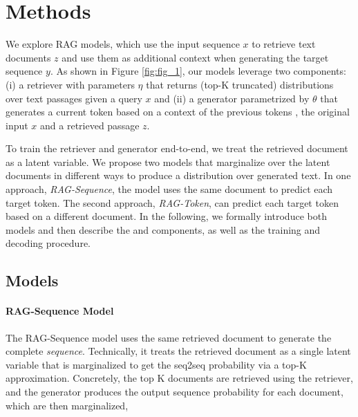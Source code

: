 \documentclass{article}
\begin{document}
\section{Methods}
\newcommand{\doc}{\ensuremath{z}}
\newcommand{\docs}{\ensuremath{\mathbf{z}}}
\newcommand{\answer}{\ensuremath{y}}
\newcommand{\genparam}{\ensuremath{\theta}}
\newcommand{\retparam}{\ensuremath{\eta}}
\newcommand{\query}{\ensuremath{x}}
\newcommand{\peranswer}{p_{\text{\tiny{RAG-Sequence}}}}
\newcommand{\pertoken}{p_{\text{\tiny{RAG-Token}}}}
\newcommand{\denc}{\mathbf{d}}
\newcommand{\qenc}{\mathbf{q}}
\newcommand{\topk}{\ensuremath{\text{top-k}(p_\eta(\cdot|\query))}}
\newcommand{\raganswer}{RAG-Sequence}
\newcommand{\ragtoken}{RAG-Token}
\newcommand{\history}[1]{{1:#1-1}}



We explore RAG models, which use the input sequence \query{} to retrieve text documents \doc{} and use them as additional context when generating the target sequence \answer{}. As shown in Figure \ref{fig:fig_1}, our models leverage two components: (i) a retriever  with parameters \retparam{} that returns (top-K truncated) distributions over text passages given a query \query{} and (ii) a generator  parametrized by \genparam{} that generates a current token based on a context of the previous  tokens , the original input \query{} and a retrieved passage \doc{}.  

To train the retriever and generator end-to-end, we treat the retrieved document as a latent variable. 
We propose two models that marginalize over the latent documents in different ways to produce a distribution over generated text. In one approach, \emph{\raganswer{}}, the model uses the same document to predict each target token. The second approach, \emph{\ragtoken{}}, can predict each target token based on a different document. In the following, we formally introduce both models and then describe the  and  components, as well as the training and decoding procedure.

\subsection{Models}
\paragraph{\raganswer{} Model}
The \raganswer{} model uses the same retrieved document to generate the complete \emph{sequence}. Technically, it treats the retrieved document as a single latent variable that is marginalized to get the seq2seq probability  via a top-K approximation. Concretely, the top K documents are retrieved using the retriever, and the generator produces the output sequence probability for each document, which are then marginalized, 
\end{document}
